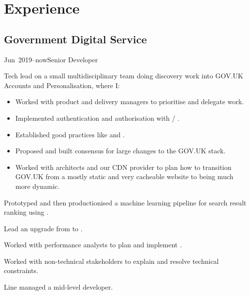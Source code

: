 \documentclass[a4paper]{barrucadu-cv}
\newcommand{\range}[2]{#1–#2}
\newcommand{\orange}[1]{\range{#1}{now}}
\begin{document}
\section{Experience}

\subsection{Government Digital Service}

\begin{cventry}{\orange{Jun~2019}}{Senior Developer}
  \begin{tightitemize}
  \item Tech lead on a small multidisciplinary  team
    doing discovery work into GOV.UK Accounts and Personalisation, where I:

    \begin{itemize}
    \item Worked with product and delivery managers to prioritise and delegate work.
    \item Implemented authentication and authorisation with  / .
    \item Established good practices like  and .
    \item Proposed and built consensus for large changes to the GOV.UK stack.
    \item Worked with architects and our CDN provider to plan how to transition GOV.UK from a mostly static and very cacheable website to being much more dynamic.
    \end{itemize}

  \item Prototyped and then productionised a machine learning pipeline
    for search result ranking using .

  \item Lead an upgrade from  to
    .

  \item Worked with performance analysts to plan and implement
    .

  \item Worked with non-technical stakeholders to explain and resolve
    technical constraints.

  \item Line managed a mid-level developer.
  \end{tightitemize}
\end{cventry}
\end{document}
